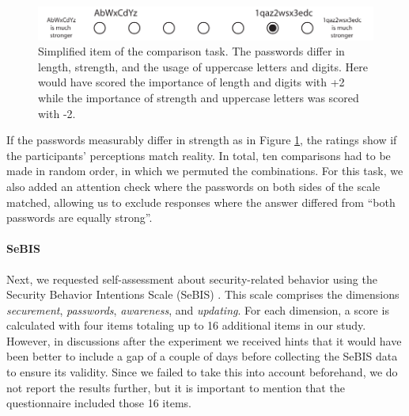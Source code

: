 \begin{figure}
	\centering
	\includegraphics[width=\linewidth]{figures/comparisontask}
	\caption{\label{fig:comparisontask} Simplified item of the comparison task. The passwords differ in length, strength, and the usage of uppercase letters and digits. Here would have scored the importance of length and digits with +2 while the importance of strength and uppercase letters was scored with -2.}
\end{figure}

If the passwords measurably differ in strength as in Figure \ref{fig:comparisontask}, the ratings show if the participants' perceptions match reality. In total, ten comparisons had to be made in random order, in which we permuted the combinations. For this task, we also added an attention check where the passwords on both sides of the scale matched, allowing us to exclude responses where the answer differed from ``both passwords are equally strong''. 

\paragraph{SeBIS} Next, we requested self-assessment about security-related behavior using the Security Behavior Intentions Scale (SeBIS) \cite{Egelman2015SeBIS}. This scale comprises the dimensions \textit{securement}, \textit{passwords}, \textit{awareness}, and \textit{updating}. For each dimension, a score is calculated with four items totaling up to 16 additional items in our study. However, in discussions after the experiment we received hints that it would have been better to include a gap of a couple of days before collecting the SeBIS data to ensure its validity. Since we failed to take this into account beforehand, we do not report the results further, but it is important to mention that the questionnaire included those 16 items. 

